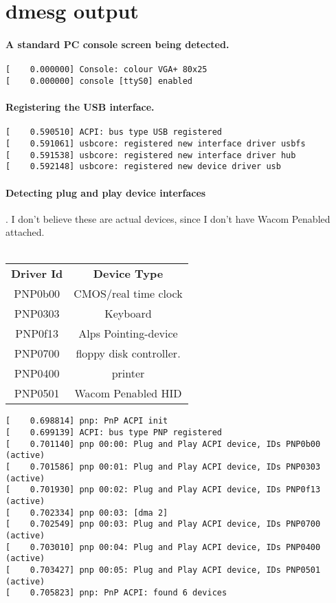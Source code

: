 \documentclass[10pt] {article}
\begin{document}
\section{dmesg output}

\paragraph{A standard PC console screen being detected.}
\begin{verbatim}
[    0.000000] Console: colour VGA+ 80x25
[    0.000000] console [ttyS0] enabled
\end{verbatim}

\paragraph{Registering the USB interface.}
\begin{verbatim}
[    0.590510] ACPI: bus type USB registered
[    0.591061] usbcore: registered new interface driver usbfs
[    0.591538] usbcore: registered new interface driver hub
[    0.592148] usbcore: registered new device driver usb
\end{verbatim}

\paragraph{Detecting plug and play device interfaces}. I don't believe these are actual devices, since I don't have Wacom Penabled attached.\\ \\
\begin{tabular}{ |c|c| } 
 \hline
\textbf{Driver Id} & \textbf{Device Type} \\
PNP0b00 & CMOS/real time clock \\ 
PNP0303 & Keyboard\\
PNP0f13 & Alps Pointing-device \\ 
PNP0700 & floppy disk controller.\\
PNP0400 & printer\\
PNP0501 & Wacom Penabled HID\\
 \hline
\end{tabular}


\begin{verbatim}
[    0.698814] pnp: PnP ACPI init
[    0.699139] ACPI: bus type PNP registered
[    0.701140] pnp 00:00: Plug and Play ACPI device, IDs PNP0b00 (active)
[    0.701586] pnp 00:01: Plug and Play ACPI device, IDs PNP0303 (active)
[    0.701930] pnp 00:02: Plug and Play ACPI device, IDs PNP0f13 (active)
[    0.702334] pnp 00:03: [dma 2]
[    0.702549] pnp 00:03: Plug and Play ACPI device, IDs PNP0700 (active)
[    0.703010] pnp 00:04: Plug and Play ACPI device, IDs PNP0400 (active)
[    0.703427] pnp 00:05: Plug and Play ACPI device, IDs PNP0501 (active)
[    0.705823] pnp: PnP ACPI: found 6 devices
\end{verbatim}
\end{document}
